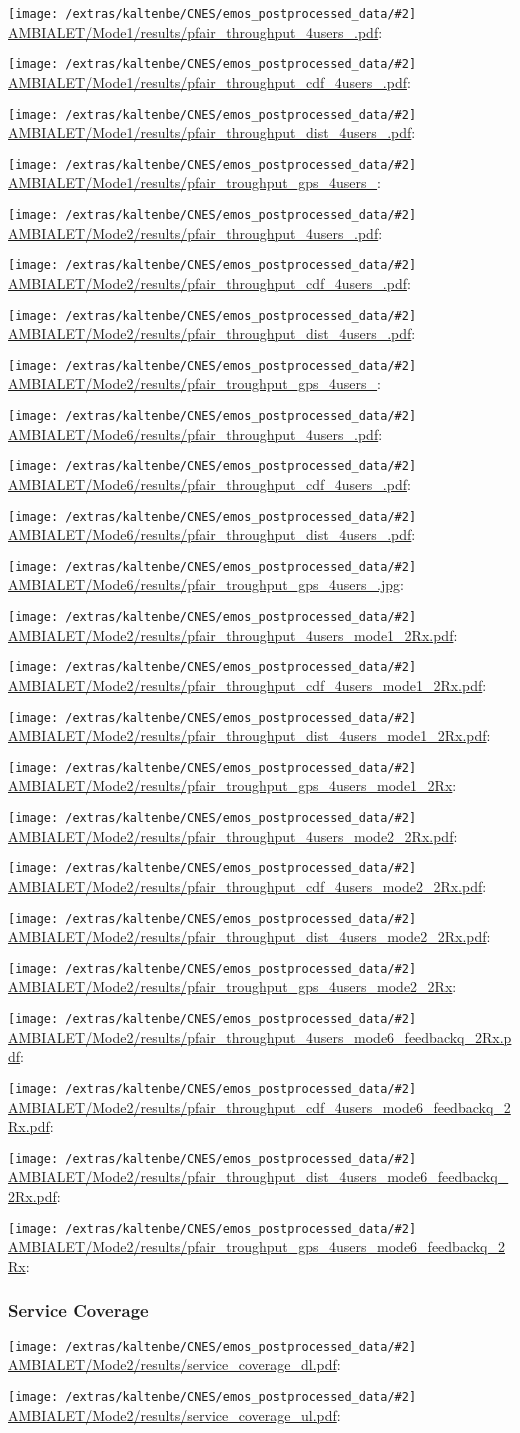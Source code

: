 \documentclass[a4paper,10pt]{article}
\newcommand{\printfile}[2][]{
 \begin{minipage}{8cm}
  \centering
  \texttt{[image: /extras/kaltenbe/CNES/emos\_postprocessed\_data/\#2]}
  \url{#2}: #1

 \end{minipage}
}
\begin{document}
\printfile{AMBIALET/Mode1/results/pfair_throughput_4users_.pdf}
\printfile{AMBIALET/Mode1/results/pfair_throughput_cdf_4users_.pdf}

\printfile{AMBIALET/Mode1/results/pfair_throughput_dist_4users_.pdf}
\printfile{AMBIALET/Mode1/results/pfair_troughput_gps_4users_}

\printfile{AMBIALET/Mode2/results/pfair_throughput_4users_.pdf}
\printfile{AMBIALET/Mode2/results/pfair_throughput_cdf_4users_.pdf}

\printfile{AMBIALET/Mode2/results/pfair_throughput_dist_4users_.pdf}
\printfile{AMBIALET/Mode2/results/pfair_troughput_gps_4users_}

\printfile{AMBIALET/Mode6/results/pfair_throughput_4users_.pdf}
\printfile{AMBIALET/Mode6/results/pfair_throughput_cdf_4users_.pdf}

\printfile{AMBIALET/Mode6/results/pfair_throughput_dist_4users_.pdf}
\printfile{AMBIALET/Mode6/results/pfair_troughput_gps_4users_.jpg}

\printfile{AMBIALET/Mode2/results/pfair_throughput_4users_mode1_2Rx.pdf}
\printfile{AMBIALET/Mode2/results/pfair_throughput_cdf_4users_mode1_2Rx.pdf}

\printfile{AMBIALET/Mode2/results/pfair_throughput_dist_4users_mode1_2Rx.pdf}
\printfile{AMBIALET/Mode2/results/pfair_troughput_gps_4users_mode1_2Rx}

\printfile{AMBIALET/Mode2/results/pfair_throughput_4users_mode2_2Rx.pdf}
\printfile{AMBIALET/Mode2/results/pfair_throughput_cdf_4users_mode2_2Rx.pdf}

\printfile{AMBIALET/Mode2/results/pfair_throughput_dist_4users_mode2_2Rx.pdf}
\printfile{AMBIALET/Mode2/results/pfair_troughput_gps_4users_mode2_2Rx}

\printfile{AMBIALET/Mode2/results/pfair_throughput_4users_mode6_feedbackq_2Rx.pdf}
\printfile{AMBIALET/Mode2/results/pfair_throughput_cdf_4users_mode6_feedbackq_2Rx.pdf}

\printfile{AMBIALET/Mode2/results/pfair_throughput_dist_4users_mode6_feedbackq_2Rx.pdf}
\printfile{AMBIALET/Mode2/results/pfair_troughput_gps_4users_mode6_feedbackq_2Rx}

\subsubsection{Service Coverage}

\printfile{AMBIALET/Mode2/results/service_coverage_dl.pdf}
\printfile{AMBIALET/Mode2/results/service_coverage_ul.pdf}
\end{document}
